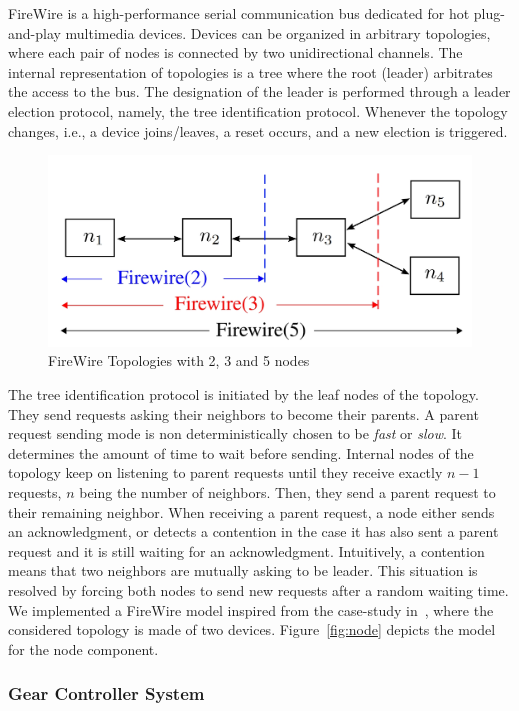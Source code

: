 FireWire is a high-performance serial communication bus dedicated for hot plug-and-play 
multimedia devices. Devices can be organized in arbitrary topologies, where each pair of nodes 
is connected by two unidirectional channels. The internal representation of topologies is a 
tree where the root (leader) arbitrates the access to the bus. The designation of the leader is 
performed through a leader election protocol, namely, the tree identification protocol. 
Whenever the topology changes, i.e., a device joins/leaves, a reset occurs, and a new election 
is triggered.
\begin{figure}[H]
  \centering
  \includegraphics[scale=0.2]{Figures/firewireg}
\caption{FireWire Topologies with 2, 3 and 5 nodes}
\label{fig:fwg}
\end{figure}
The tree identification protocol is initiated by the leaf nodes of the topology. They send 
requests asking their neighbors to become their parents. A parent request sending mode is 
non deterministically chosen to be \emph{fast} or \emph{slow}. It determines the amount of time 
to wait before sending. Internal nodes of the topology keep on listening to parent requests 
until they receive exactly $n-1$ requests, $n$ being the number of neighbors. 
Then, they send a parent request
to their remaining neighbor. When receiving a parent request, a node either sends an 
acknowledgment, or detects a contention in the case it has also sent a parent request and it
is still waiting for an acknowledgment. Intuitively, a contention means that two neighbors are 
mutually asking to be leader. This situation is resolved by forcing both nodes to send new 
requests after a random waiting time.
We implemented a FireWire model inspired from the case-study in~\cite{firewire}, where the 
considered topology is made of two devices. 
Figure~\ref{fig:node} depicts the model for the node component.


\subsubsection{Gear Controller System}

